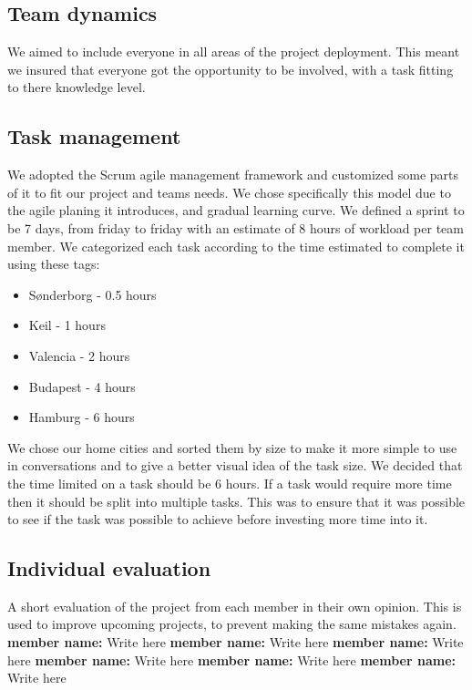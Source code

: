 \documentclass[../report.tex]{subfiles}
\begin{document}
\subsection{Team dynamics}
We aimed to include everyone in all areas of the project deployment. This meant
we insured that everyone got the opportunity to be involved, with a task
fitting to there knowledge level.

\subsection{Task management}

We adopted the Scrum agile management framework and customized some parts of it to fit our project
and teams needs. We chose specifically this model due to the agile planing it introduces, and gradual
learning curve. We defined a sprint to be 7 days, from friday to friday with an estimate of 8 hours of
workload per team member. We categorized each task according to the time estimated to complete it
using these tags:

\begin{itemize}
    \item Sønderborg - 0.5 hours
    \item Keil - 1 hours
    \item Valencia - 2 hours
    \item Budapest - 4 hours
    \item Hamburg -  6 hours
\end{itemize}

We chose our home cities and sorted them by size to make it more simple to use
in conversations and to give a better visual idea of the task size. We decided
that the time limited on a task should be 6 hours. If a task would require more
time then it should be split into multiple tasks. This was to ensure that it
was possible to see if the task was possible to achieve before investing more
time into it.

\subsection{Individual evaluation}
A short evaluation of the project from each member in their own opinion. This is used to improve
upcoming projects, to prevent making the same mistakes again.
\textbf{member name:}
Write here
\textbf{member name:}
Write here
\textbf{member name:}
Write here
\textbf{member name:}
Write here
\textbf{member name:}
Write here
\textbf{member name:}
Write here
\end{document}
